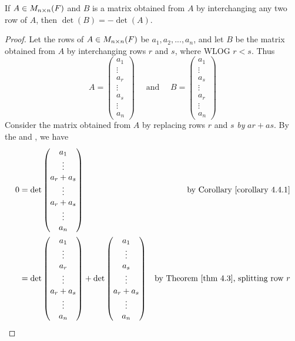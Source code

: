 \begin{theorem} \label{thm 4.5}
If \(A \in M_{n \times n}(F)\) and \(B\) is a matrix obtained from \(A\) by interchanging any two row of \(A\), then \(\det(B) = -\det(A)\).
\end{theorem}

\begin{proof}
Let the rows of \(A \in M_{n \times n}(F)\) be \(a_1, a_2, ..., a_n\), and let \(B\) be the matrix obtained from \(A\) by interchanging rows \(r\) and \(s\), where WLOG \(r < s\).
Thus
\[
    A = \left(\begin{array}{c} a_{1} \\ \vdots \\ a_{r} \\ \vdots \\ a_{s} \\ \vdots \\ a_{n} \end{array}\right)
    \quad \text { and } \quad
    B = \left(\begin{array}{c} a_{1} \\ \vdots \\ a_{s} \\ \vdots \\ a_{r} \\ \vdots \\ a_{n} \end{array}\right)
\]
Consider the matrix obtained from \(A\) by replacing rows \(r\) and \(s\) \emph{by} \(ar + as\).
By the  and , we have
\begin{align*}
    0 & = \det \begin{pmatrix} a_{1} \\ \vdots \\ a_{r} + a_{s} \\ \vdots \\ a_{r}+a_{s} \\ \vdots \\ a_{n} \end{pmatrix} & \text{by \CORO{4.4.1}} \\
      & = \det \begin{pmatrix} a_{1} \\ \vdots \\ a_{r} \\ \vdots \\ a_{r}+a_{s} \\ \vdots \\ a_{n} \end{pmatrix}
        + \det\begin{pmatrix} a_{1} \\ \vdots \\ a_{s} \\ \vdots \\ a_{r}+a_{s} \\ \vdots \\ a_{n} \end{pmatrix} & \text{by \THM{4.3}, splitting row \(r\)} \\

\end{align*}
\end{proof}
